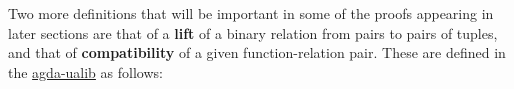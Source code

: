 \documentclass[sigplan,screen]{acmart}
\newcommand{\agdaualib}{\href{https://ualib.org}{agda-ualib}\xspace}
\newcommand{\agdaualib}{\href{anonymizedLink/agda-ualib.html}{agda-ualib}\xspace}
\begin{document}
Two more definitions that will be important in some of the proofs appearing in later sections are that of a \textbf{lift} of a binary relation from pairs to pairs of tuples, and that of \textbf{compatibility} of a given function-relation pair. These are defined in the \agdaualib as follows:
\begin{code}\>[0]\AgdaSpace{}%
\AgdaSymbol{:}
\>[10]\AgdaSymbol{\{}\AgdaSpace{}%
\AgdaSymbol{:}\AgdaSpace{}%
\AgdaSpace{}%
\AgdaSpace{}%
\AgdaSymbol{\}}\AgdaSpace{}%
\AgdaSymbol{\{}\AgdaSpace{}%
\AgdaSymbol{:}\AgdaSpace{}%
\AgdaSpace{}%
\AgdaSpace{}%
\AgdaSymbol{\}}\<%
\\
\>[0][@{}l@{\AgdaIndent{0}}]%
\>[1]%
\>[10]\AgdaSpace{}%
\AgdaSpace{}%
\AgdaSpace{}%
\AgdaSpace{}%
\AgdaSymbol{(}\AgdaSpace{}%
\AgdaSpace{}%
\AgdaSymbol{)}\AgdaSpace{}%
\AgdaSpace{}%
\AgdaSymbol{(}\AgdaSpace{}%
\AgdaSpace{}%
\AgdaSymbol{)}\<%
\\
\>[0][@{}l@{\AgdaIndent{0}}]%
\>[1]%
\>[10]\AgdaSpace{}%
\AgdaSpace{}%
\AgdaSpace{}%
\<%
\\
\>[0]\AgdaSpace{}%
\AgdaSpace{}%
\AgdaSpace{}%
\AgdaSpace{}%
\AgdaSymbol{=}\AgdaSpace{}%
\AgdaSpace{}%
\AgdaSpace{}%
\AgdaSpace{}%
\AgdaSpace{}%
\AgdaSymbol{(}\AgdaSpace{}%
\AgdaSymbol{)}\AgdaSpace{}%
\AgdaSymbol{(}\AgdaSpace{}%
\AgdaSymbol{)}\<%
\end{code}
\end{document}
